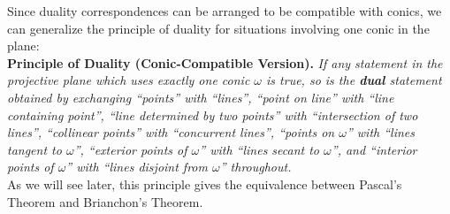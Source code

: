 \documentclass[leqno]{book}
\begin{document}
Since duality correspondences can be arranged to be compatible with conics, we can generalize the principle of duality for situations involving one conic in the plane:\\

\noindent\textbf{Principle of Duality (Conic-Compatible Version).} \emph{If any statement in the projective plane which uses exactly one conic $\omega$ is true, so is the \textbf{dual} statement obtained by exchanging ``points'' with ``lines'', ``point on line'' with ``line containing point'', ``line determined by two points'' with ``intersection of two lines'', ``collinear points'' with ``concurrent lines'', ``points on $\omega$'' with ``lines tangent to $\omega$'', ``exterior points of $\omega$'' with ``lines secant to $\omega$'', and ``interior points of $\omega$'' with ``lines disjoint from $\omega$'' throughout.}\\

\noindent As we will see later, this principle gives the equivalence between Pascal's Theorem and Brianchon's Theorem.
\end{document}
